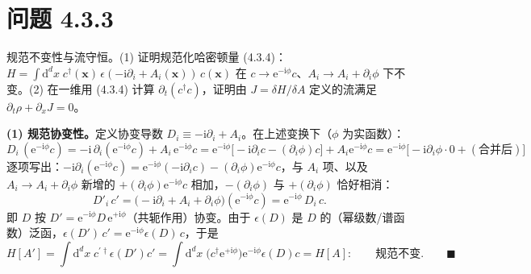 \section*{问题 4.3.3}
\begin{problem}
规范不变性与流守恒。(1) 证明规范化哈密顿量 (4.3.4)：$H=\int\mathrm{d}^dx\;c^\dagger(\pmb x)\,\epsilon(-\mathrm{i}\partial_i+A_i(\pmb x))\,c(\pmb x)$ 在 $c\to\mathrm{e}^{-\mathrm{i}\phi}c$、$A_i\to A_i+\partial_i\phi$ 下不变。(2) 在一维用 (4.3.4) 计算 $\partial_t(c^\dagger c)$，证明由 $J=\delta H/\delta A$ 定义的流满足 $\partial_t\rho+\partial_xJ=0$。
\end{problem}
\solution
\textbf{(1) 规范协变性。}定义协变导数 $D_i\equiv-\mathrm{i}\partial_i+A_i$。在上述变换下（$\phi$ 为实函数）：
\begin{equation*}
D_i\,(\mathrm{e}^{-\mathrm{i}\phi}c)
=-\mathrm{i}\,\partial_i(\mathrm{e}^{-\mathrm{i}\phi}c)+A_i\,\mathrm{e}^{-\mathrm{i}\phi}c
=\mathrm{e}^{-\mathrm{i}\phi}\big[-\mathrm{i}\partial_ic-(\partial_i\phi)c\big]+A_i\mathrm{e}^{-\mathrm{i}\phi}c
=\mathrm{e}^{-\mathrm{i}\phi}\big[-\mathrm{i}\partial_i\phi\cdot0+(\text{合并后})\big]
\end{equation*}
逐项写出：$-\mathrm{i}\partial_i(\mathrm{e}^{-\mathrm{i}\phi}c)=\mathrm{e}^{-\mathrm{i}\phi}(-\mathrm{i}\partial_ic)-(\partial_i\phi)\mathrm{e}^{-\mathrm{i}\phi}c$，与 $A_i$ 项、以及 $A_i\to A_i+\partial_i\phi$ 新增的 $+(\partial_i\phi)\mathrm{e}^{-\mathrm{i}\phi}c$ 相加，$-(\partial_i\phi)$ 与 $+(\partial_i\phi)$ 恰好相消：
\begin{equation*}
D'_i\,c'=\big(-\mathrm{i}\partial_i+A_i+\partial_i\phi\big)(\mathrm{e}^{-\mathrm{i}\phi}c)
=\mathrm{e}^{-\mathrm{i}\phi}\,D_i\,c .
\end{equation*}
即 $D$ 按 $D'=\mathrm{e}^{-\mathrm{i}\phi}D\,\mathrm{e}^{+\mathrm{i}\phi}$（共轭作用）协变。由于 $\epsilon(D)$ 是 $D$ 的（幂级数/谱函数）泛函，$\epsilon(D')\,c'=\mathrm{e}^{-\mathrm{i}\phi}\epsilon(D)\,c$，于是
\begin{equation*}
H[A']=\int\mathrm{d}^dx\;c^{\prime\dagger}\epsilon(D')c'
=\int\mathrm{d}^dx\;\big(c^\dagger\mathrm{e}^{+\mathrm{i}\phi}\big)\mathrm{e}^{-\mathrm{i}\phi}\epsilon(D)c
=H[A]:\qquad\text{规范不变}.\qquad\blacksquare
\end{equation*}

